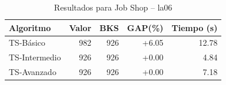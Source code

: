 \begin{table}[h]
\centering
\caption{Resultados para Job Shop -- la06}
\label{tab:jobshop_la06}
\begin{tabular}{lrrrr}
\hline
\textbf{Algoritmo} & \textbf{Valor} & \textbf{BKS} & \textbf{GAP(\%)} & \textbf{Tiempo (s)} \\
\hline
TS-Básico & 982 & 926 & +6.05 & 12.78 \\
TS-Intermedio & 926 & 926 & +0.00 & 4.84 \\
TS-Avanzado & 926 & 926 & +0.00 & 7.18 \\
\hline
\end{tabular}
\end{table}
